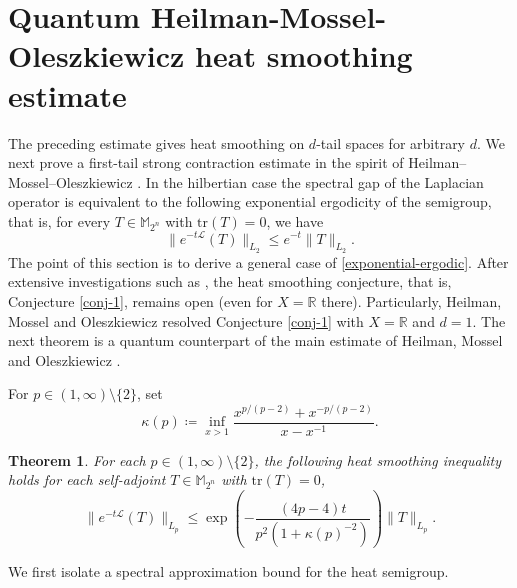 \documentclass{amsbook}
\newtheorem{theorem}{Theorem}[chapter]
\theoremstyle{definition}
\theoremstyle{remark}
\numberwithin{section}{chapter}
\numberwithin{equation}{chapter}
\newcommand{\1}{\mathbf{1}}
\begin{document}
\section{Quantum Heilman-Mossel-Oleszkiewicz heat smoothing estimate}

The preceding estimate gives heat smoothing on \(d\)-tail spaces for arbitrary \(d\).  We next prove a first-tail strong contraction estimate in the spirit of Heilman--Mossel--Oleszkiewicz \cite{HMO2017}. In the hilbertian case the spectral gap of the Laplacian operator is equivalent to the following exponential ergodicity of the semigroup, that is, for every $T\in \mathbb{M}_{2^{n}}$ with $\mathrm{tr}(T)=0$, we have
\begin{equation}\label{exponential-ergodic}
\|e^{-t\mathcal{L}}(T)\|_{L_{2}}\leq e^{-t}\|T\|_{L_{2}}.
\end{equation}
The point of this section is to derive  a general case of \eqref{exponential-ergodic}. After extensive investigations such as \cite{EI2020,EI2023,HMO2017,Vo2024}, the heat smoothing conjecture, that is, Conjecture \ref{conj-1}, remains open (even for $X=\mathbb{R}$ there). Particularly, Heilman, Mossel and Oleszkiewicz \cite{HMO2017} resolved Conjecture \ref{conj-1} with $X=\mathbb{R}$ and $d=1$. The next theorem is a quantum counterpart of the main estimate of Heilman, Mossel and Oleszkiewicz \cite{HMO2017}.

For $p\in(1,\infty)\setminus\{2\}$, set
\[
\kappa(p)\coloneqq\inf_{x>1}\frac{x^{p/(p-2)}+x^{-p/(p-2)}}{x-x^{-1}}.
\]


\begin{theorem}\label{heat-semigroup-f2828b}
For each $p\in (1,\infty)\setminus\{2\}$, the following heat smoothing inequality holds for each self-adjoint $T\in \mathbb{M}_{2^n}$ with $\mathrm{tr}(T)=0$,
\[
\|e^{-t\mathcal{L}}(T)\|_{L_p}\leq \exp\left(-\frac{(4p-4)t}{p^2(1+\kappa(p)^{-2})}\right)\|T\|_{L_{p}}.
\]
\end{theorem} 

We first isolate a spectral approximation bound for the heat semigroup.
\end{document}

